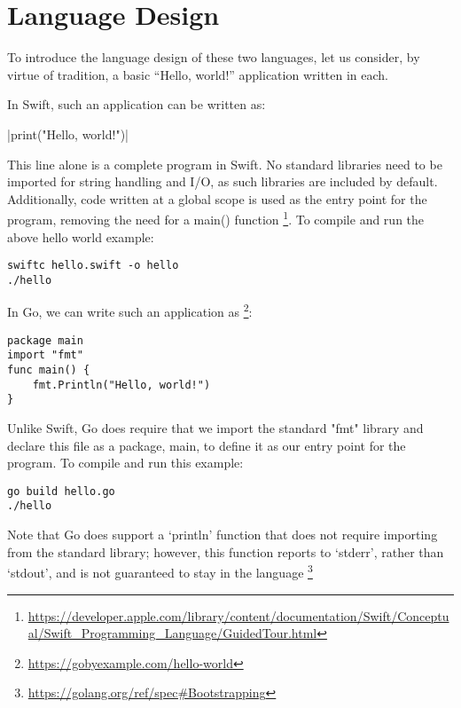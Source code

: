 \documentclass[letterpaper]{article}
\begin{document}
\section{Language Design}

To introduce the language design of these two languages, let us consider, by virtue of tradition, a basic “Hello, world!” application written in each.

In Swift, such an application can be written as:

|print("Hello, world!")|

This line alone is a complete program in Swift. No standard libraries need to be imported for string handling and I/O, as such libraries are included by default. Additionally, code written at a global scope is used as the entry point for the program, removing the need for a main() function \footnote{\url{https://developer.apple.com/library/content/documentation/Swift/Conceptual/Swift_Programming_Language/GuidedTour.html}}. To compile and run the above hello world example:

\begin{verbatim}
swiftc hello.swift -o hello
./hello
\end{verbatim}

In Go, we can write such an application as \footnote{\url{https://gobyexample.com/hello-world}}:

\begin{verbatim}
package main
import "fmt"
func main() {
    fmt.Println("Hello, world!")
}
\end{verbatim}

Unlike Swift, Go does require that we import the standard "fmt" library and declare this file as a package, main, to define it as our entry point for the program. To compile and run this example:

\begin{verbatim}
go build hello.go
./hello
\end{verbatim}

Note that Go does support a `println' function that does not require importing from the standard library; however, this function reports to `stderr', rather than `stdout', and is not guaranteed to stay in the language \footnote{\url{https://golang.org/ref/spec#Bootstrapping}}
\end{document}
